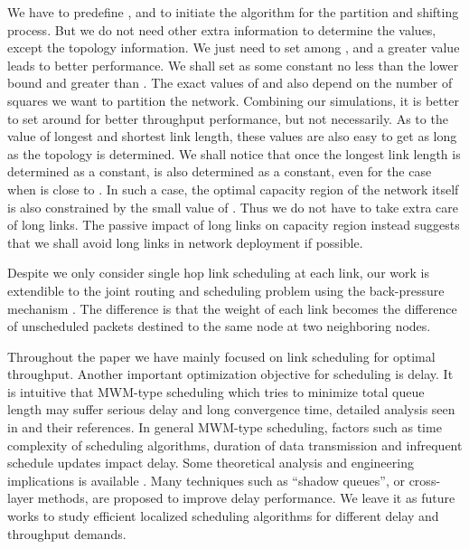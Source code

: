 \documentclass[journal]{IEEEtran}
\begin{document}
 We have to predefine ,  and  to initiate the algorithm for the partition and shifting process. But we do not need other extra information to determine the values, except the topology information. We just need to set  among , and a greater value leads to better performance. We shall set  as some constant no less than the lower bound and  greater than . The exact values of  and  also depend on the number of squares we want to partition the network. Combining our simulations, it is better to set  around  for better throughput performance, but not necessarily.
As to the value of longest and shortest link length, these values are also easy to get as long as the topology is determined. We shall notice that once the longest link length  is determined as a constant,  is also determined as a constant, even for the case  when  is close to . In such a case, the optimal capacity region of the network itself is also constrained by the small value of  . Thus we do not have to take extra care of long links. The passive impact of long links on capacity region instead suggests that we shall avoid long links in network deployment if possible.

Despite we only consider  single hop link scheduling at each link, our work is  extendible to  the joint routing and scheduling problem using the back-pressure mechanism \cite{sha07}. The difference is that the weight of each link becomes the difference of unscheduled packets destined to the same node at  two neighboring nodes.

Throughout the paper we have mainly focused on link scheduling for optimal throughput. Another important optimization objective for scheduling is delay. It is intuitive that MWM-type scheduling which tries to minimize total queue length may suffer serious delay and long convergence time, detailed analysis seen in \cite{bui-info09} \cite{lei-info08} and their references.
 In general MWM-type scheduling,  factors such as  time complexity of  scheduling algorithms, duration of data transmission and infrequent schedule updates impact delay. Some theoretical analysis and engineering implications is available \cite{yi-mobihoc09}.
Many techniques such as ``shadow queues''\cite{bui-info09}, or cross-layer methods\cite{ruogu-ton11}, are proposed to improve delay performance. We leave it as future works to study efficient   localized scheduling algorithms for different delay and throughput demands.
\end{document}
